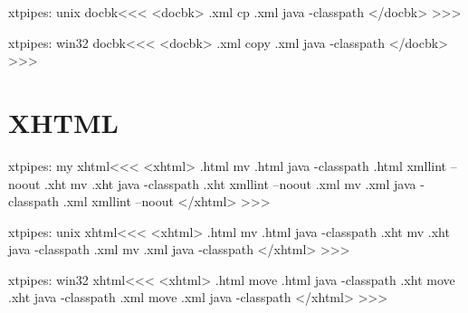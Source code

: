 \documentclass{article}
\begin{document}
\<xtpipes: unix docbk\><<<
<docbk>
.xml cp %
.xml java -classpath %
</docbk>
>>>


\<xtpipes: win32 docbk\><<<
<docbk>
.xml copy %
.xml java -classpath  %
</docbk>
>>>








\section{XHTML}

\<xtpipes: my xhtml\><<<
<xhtml>
.html mv %
.html java -classpath %
.html xmllint --noout %
.xht mv %
.xht java -classpath %
.xht xmllint --noout %
.xml mv %
.xml java -classpath %
.xml xmllint --noout %
</xhtml>
>>>


\<xtpipes: unix xhtml\><<<
<xhtml>
.html mv %
.html java -classpath  %
.xht mv %
.xht java -classpath  %
.xml mv %
.xml java -classpath  %
</xhtml>
>>>


\<xtpipes: win32 xhtml\><<<
<xhtml>
.html move %
.html java -classpath  %
.xht move %
.xht java -classpath  %
.xml move %
.xml java -classpath  %
</xhtml>
>>>
\end{document}
